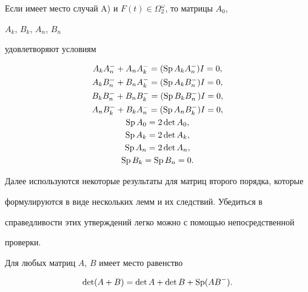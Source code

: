 

 


 


\begin{cornonum} 


Если имеет место случай A) и $F(t)\in\Omega^\omega_2$, то матрицы $A_0$, 


$A_k$, $B_k$, $A_n$, $B_n$ 


удовлетворяют условиям 


\begin{gather} 


A_k A^-_n+A_n A^-_k=(\Sp A_k A^-_n)I=0,\\ 


% 


A_k B^-_n+B_n A^-_k=(\Sp A_k B^-_n)I=0,\\ 


% 


B_k B^-_n+B_n B^-_k=(\Sp B_k B^-_n)I=0,\\ 


% 


A_n B^-_k+B_k A^-_n=(\Sp A_n B^-_k)I=0,\\ 


% 


\Sp A_0=2\det A_0,\\ 


\Sp A_k=2\det A_k,\\ 


\Sp A_n=2\det A_n,\\ 


\Sp B_k=\Sp B_n=0. 


\end{gather} 


\end{cornonum} 


 


Далее используются некоторые результаты для матриц второго порядка, которые 


формулируются в виде нескольких лемм и их следствий. Убедиться в 


справедливости этих утверждений легко можно с помощью непосредственной 


проверки. 


 


 


\begin{lem} 


Для любых матриц $A$, $B$ имеет место равенство 


$$ 


\det (A+B)=\det A+\det B+\Sp(AB^-). 


$$ 


\end{lem} 


